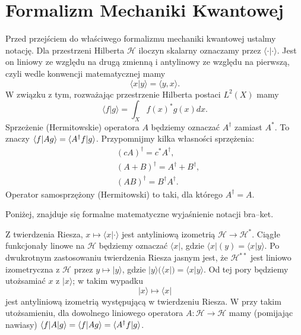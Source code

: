 \section{Formalizm Mechaniki Kwantowej}
Przed przejściem do właściwego formalizmu mechaniki kwantowej
ustalmy notację. Dla przestrzeni Hilberta $\mathcal H$ iloczyn skalarny
oznaczamy przez $\langle \cdot | \cdot \rangle$. Jest on liniowy ze względu
na drugą zmienną i antylinowy ze względu na pierwszą, czyli wedle konwencji
matematycznej mamy
\begin{equation*}
    \langle x | y \rangle = \langle y, x \rangle.
\end{equation*}
W związku z tym, rozważając przestrzenie Hilberta postaci $L^2(X)$ mamy
\begin{equation*}
    \langle f | g \rangle = \int_X f(x)^* g(x) dx.
\end{equation*}
Sprzeżenie (Hermitowskie) operatora $A$ będziemy oznaczać $A^\dagger$
zamiast $A^*$. To znaczy $\braket{f|Ag} = \braket{A^\dagger f| g}$.
Przypomnijmy kilka własności sprzężenia:
\begin{equation*}
	\begin{split}
		&(cA)^{\dagger} = c^* A^{\dagger}, \\
		&(A + B)^{\dagger} = A^{\dagger} + B^{\dagger},\\
		&(AB)^{\dagger} = B^{\dagger}A^{\dagger}.
	\end{split}
\end{equation*}
Operator samosprzężony (Hermitowski) to taki, dla którego $A^\dagger = A$.

Poniżej, znajduje się formalne matematyczne wyjaśnienie notacji bra--ket.

Z twierdzenia Riesza, $x \mapsto \langle x | \cdot \rangle$ jest antyliniową
izometrią $\mathcal H \to \mathcal H^*$.
Ciągłe funkcjonały linowe na $\mathcal H$ będziemy oznaczać $\langle x|$,
gdzie $\langle x| (y) = \langle x | y \rangle$.
Po dwukrotnym zastosowaniu twierdzenia Riesza jasnym jest, że $\mathcal H^{**}$
jest liniowo izometryczna z $\mathcal H$ przez $y \mapsto | y \rangle$, gdzie
$|y\rangle (\langle x |) = \langle x | y \rangle$.
Od tej pory będziemy utożsamiać $x$ z $|x\rangle$; w takim wypadku
\begin{equation*}
    |x \rangle \mapsto \langle x |
\end{equation*}
jest antyliniową izometrią występującą w twierdzeniu Riesza.
W przy takim utożsamieniu, dla dowolnego liniowego operatora
$A \colon \mathcal H \to \mathcal H$ mamy (pomijając nawiasy)
$\braket{f|A|g} = \braket{f|Ag} = \braket{A^\dagger f | g}$.

